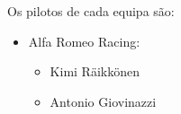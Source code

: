 \documentclass{report}
\begin{document}
Os pilotos de cada equipa são:
\begin{itemize}
    \item Alfa Romeo Racing:
        \begin{itemize}
            \item Kimi Räikkönen 
            \item Antonio Giovinazzi
        \begin{figure}[!h]
            \begin{floatrow}

\end{floatrow}
\end{figure}
\end{itemize}
\end{itemize}
\end{document}
